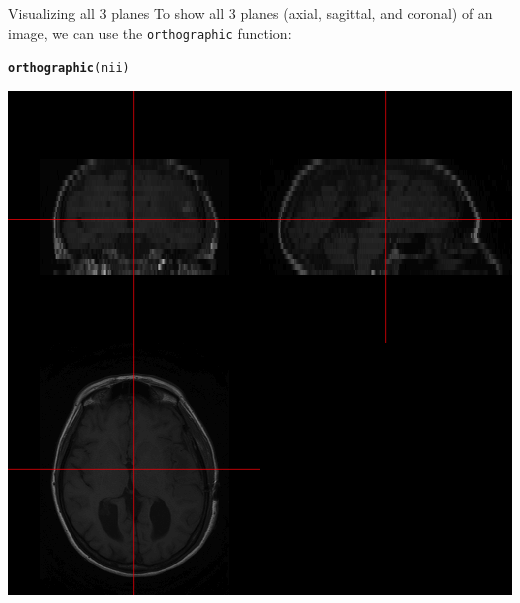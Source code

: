 \documentclass[11pt]{beamer}\usepackage[]{graphicx}\usepackage[]{color}
\makeatletter
\newcommand{\hlstd}[1]{\textcolor[rgb]{0.345,0.345,0.345}{#1}}%
\newcommand{\hlkwd}[1]{\textcolor[rgb]{0.737,0.353,0.396}{\textbf{#1}}}%
\newenvironment{kframe}{%
 \def\at@end@of@kframe{}%
 \ifinner\ifhmode%
  \def\at@end@of@kframe{\end{minipage}}%
  \begin{minipage}{\columnwidth}%
 \fi\fi%
 \def\FrameCommand##1{\hskip\@totalleftmargin \hskip-\fboxsep
 \colorbox{shadecolor}{##1}\hskip-\fboxsep
     \hskip-\linewidth \hskip-\@totalleftmargin \hskip\columnwidth}%
 \MakeFramed {\advance\hsize-\width
   \@totalleftmargin\z@ \linewidth\hsize
   \@setminipage}}%
 {\par\unskip\endMakeFramed%
 \at@end@of@kframe}
\newenvironment{knitrout}{}{} %
\makeatother
\begin{document}
\begin{frame}[fragile]{Visualizing all 3 planes}
To show all 3 planes (axial, sagittal, and coronal) of an image, we can use the \verb|orthographic| function:

\begin{center}
\begin{knitrout}
\color{fgcolor}\begin{kframe}
\begin{alltt}
\hlkwd{orthographic}\hlstd{(nii)}
\end{alltt}
\end{kframe}
\includegraphics[width=\textwidth,height=0.5\textheight,keepaspectratio]{figure/image_ortho-1} 

\end{knitrout}
\end{center}

\end{frame}
\end{document}

